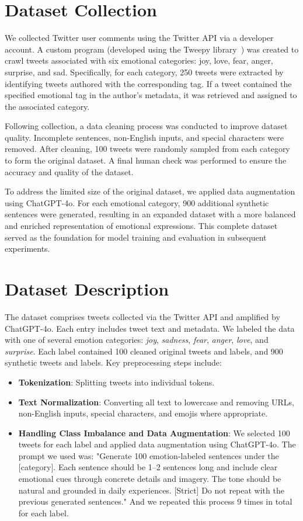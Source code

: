 \documentclass{article}
\begin{document}
\section{Dataset Collection}

We collected Twitter user comments using the Twitter API via a developer account. A custom program (developed using the Tweepy library~\cite{tweepy}) was created to crawl tweets associated with six emotional categories: joy, love, fear, anger, surprise, and sad. Specifically, for each category, 250 tweets were extracted by identifying tweets authored with the corresponding tag. If a tweet contained the specified emotional tag in the author's metadata, it was retrieved and assigned to the associated category.

Following collection, a data cleaning process was conducted to improve dataset quality. Incomplete sentences, non-English inputs, and special characters were removed. After cleaning, 100 tweets were randomly sampled from each category to form the original dataset. A final human check was performed to ensure the accuracy and quality of the dataset.

To address the limited size of the original dataset, we applied data augmentation using ChatGPT-4o. For each emotional category, 900 additional synthetic sentences were generated, resulting in an expanded dataset with a more balanced and enriched representation of emotional expressions. This complete dataset served as the foundation for model training and evaluation in subsequent experiments.

\section{Dataset Description}
The dataset comprises tweets collected via the Twitter API and amplified by ChatGPT-4o. Each entry includes tweet text and metadata. We labeled the data with one of several emotion categories: \emph{joy}, \emph{sadness}, \emph{fear}, \emph{anger}, \emph{love}, and \emph{surprise}. Each label contained 100 cleaned original tweets and labels, and 900 synthetic tweets and labels. Key preprocessing steps include:

\begin{itemize}
    \item \textbf{Tokenization}: Splitting tweets into individual tokens.
    \item \textbf{Text Normalization}: Converting all text to lowercase and removing URLs, non-English inputs, special characters, and emojis where appropriate.
    \item \textbf{Handling Class Imbalance and Data Augmentation}: We selected 100 tweets for each label and applied data augmentation using ChatGPT-4o. The prompt we used was: "Generate 100 emotion-labeled sentences under the [category]. Each sentence should be 1–2 sentences long and include clear emotional cues through concrete details and imagery. The tone should be natural and grounded in daily experiences. [Strict] Do not repeat with the previous generated sentences." And we repeated this process 9 times in total for each label.
\end{itemize}
\end{document}
